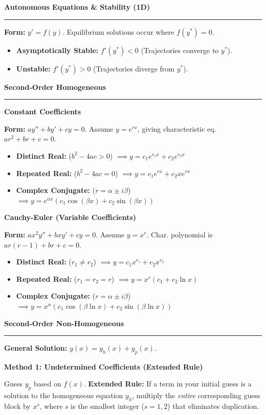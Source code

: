 \documentclass[10pt, landscape, twocolumn]{article}
\newcommand{\cheatsheetsection}[1]{
    \vspace{0.6em}
    {\color{themeblue}\large\bfseries #1} \par
    \vspace{-0.5em}
    {\color{themeblue}\rule{\linewidth}{1pt}} \par
    \vspace{0.2em}
}
\newcommand{\cheatsheetsubsection}[1]{
    \vspace{0.4em}
    {\color{themeblue}\normalsize\bfseries #1} \par
    \vspace{0.1em}
}
\begin{document}
\cheatsheetsection{Autonomous Equations \& Stability (1D)}
\textbf{Form:} $y' = f(y)$. Equilibrium solutions occur where $f(y^*) = 0$.
\begin{itemize}[leftmargin=*, nosep]
    \item \textbf{Asymptotically Stable:} $f'(y^*) < 0$ (Trajectories converge to $y^*$).
    \item \textbf{Unstable:} $f'(y^*) > 0$ (Trajectories diverge from $y^*$).
\end{itemize}

\cheatsheetsection{Second-Order Homogeneous}

\cheatsheetsubsection{Constant Coefficients}
\textbf{Form:} $ay'' + by' + cy = 0$. Assume $y = e^{rx}$, giving characteristic eq. $ar^2 + br + c = 0$.
\begin{itemize}[leftmargin=*, nosep]
    \item \textbf{Distinct Real:} ($b^2 - 4ac > 0$) $\implies y = c_1 e^{r_1 x} + c_2 e^{r_2 x}$
    \item \textbf{Repeated Real:} ($b^2 - 4ac = 0$) $\implies y = c_1 e^{r x} + c_2 x e^{r x}$
    \item \textbf{Complex Conjugate:} ($r = \alpha \pm i\beta$) $\implies y = e^{\alpha x} (c_1 \cos(\beta x) + c_2 \sin(\beta x))$
\end{itemize}

\newpage

\cheatsheetsubsection{Cauchy-Euler (Variable Coefficients)}
\textbf{Form:} $ax^2y'' + bxy' + cy = 0$. Assume $y = x^r$. Char. polynomial is $ar(r-1) + br + c = 0$.
\begin{itemize}[leftmargin=*, nosep]
    \item \textbf{Distinct Real:} ($r_1 \neq r_2$) $\implies y = c_1 x^{r_1} + c_2 x^{r_2}$
    \item \textbf{Repeated Real:} ($r_1 = r_2 = r$) $\implies y = x^r (c_1 + c_2 \ln x)$
    \item \textbf{Complex Conjugate:} ($r = \alpha \pm i\beta$) $\implies y = x^\alpha (c_1 \cos(\beta \ln x) + c_2 \sin(\beta \ln x))$
\end{itemize}

\cheatsheetsection{Second-Order Non-Homogeneous}
\textbf{General Solution:} $y(x) = y_h(x) + y_p(x)$.

\cheatsheetsubsection{Method 1: Undetermined Coefficients (Extended Rule)}
Guess $y_p$ based on $f(x)$. \textbf{Extended Rule:} If a term in your initial guess is a solution to the homogeneous equation $y_h$, multiply the \textit{entire} corresponding guess block by $x^s$, where $s$ is the smallest integer ($s=1, 2$) that eliminates duplication.
\end{document}
